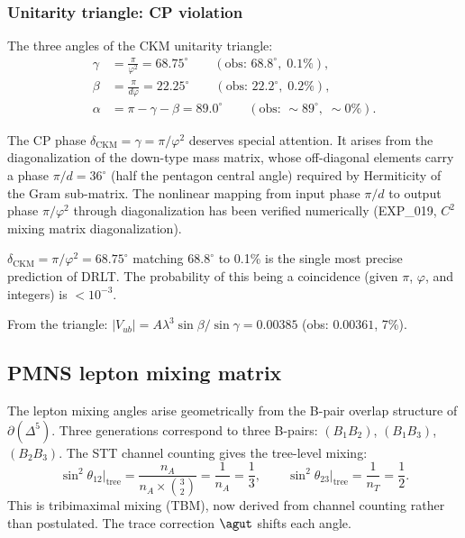 \subsubsection{Unitarity triangle: CP violation}

The three angles of the CKM unitarity triangle:
\begin{align}
\gamma &= \frac{\pi}{\varphi^2} = 68.75^\circ \qquad (\text{obs: } 68.8^\circ,\; 0.1\%), \label{eq:gamma} \\
\beta &= \frac{\pi}{d\varphi} = 22.25^\circ \qquad (\text{obs: } 22.2^\circ,\; 0.2\%), \\
\alpha &= \pi - \gamma - \beta = 89.0^\circ \qquad (\text{obs: } \sim 89^\circ,\; \sim 0\%).
\end{align}

The CP phase $\delta_\text{CKM} = \gamma = \pi/\varphi^2$ deserves special attention. It arises from the diagonalization of the down-type mass matrix, whose off-diagonal elements carry a phase $\pi/d = 36^\circ$ (half the pentagon central angle) required by Hermiticity of the Gram sub-matrix. The nonlinear mapping from input phase $\pi/d$ to output phase $\pi/\varphi^2$ through diagonalization has been verified numerically (EXP\_019, $C^2$ mixing matrix diagonalization).

\begin{remark}
$\delta_\text{CKM} = \pi/\varphi^2 = 68.75^\circ$ matching $68.8^\circ$ to 0.1\% is the single most precise prediction of DRLT. The probability of this being a coincidence (given $\pi$, $\varphi$, and integers) is $< 10^{-3}$.
\end{remark}

From the triangle: $|V_{ub}| = A\lambda^3\sin\beta/\sin\gamma = 0.00385$ (obs: $0.00361$, 7\%).

\subsection{PMNS lepton mixing matrix}

The lepton mixing angles arise geometrically from the B-pair overlap structure of $\partial(\Delta^5)$.  Three generations correspond to three B-pairs: $(B_1 B_2)$, $(B_1 B_3)$, $(B_2 B_3)$.  The STT channel counting gives the tree-level mixing:
\begin{equation}
\sin^2\theta_{12}\big|_\text{tree} = \frac{n_A}{n_A \times \binom{3}{2}} = \frac{1}{n_A} = \frac{1}{3}, \qquad
\sin^2\theta_{23}\big|_\text{tree} = \frac{1}{n_T} = \frac{1}{2}.
\end{equation}
This is tribimaximal mixing (TBM), now derived from channel counting rather than postulated.  The trace correction $\agut$ shifts each angle.

